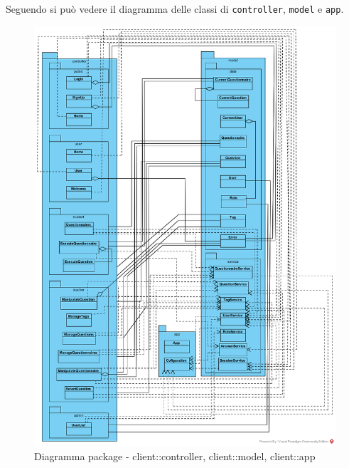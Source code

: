 Seguendo si può vedere il diagramma delle classi di \texttt{controller}, \texttt{model} e \texttt{app}.
\begin{center}
	\begin{figure}[H]
		\centering \includegraphics[scale=4, max width=\textwidth, max height=\myheight]{../img/diagrammiClassi/client/controllerModelApp.png}
		\caption{Diagramma package - client::controller, client::model, client::app}
	\end{figure}
\end{center}

